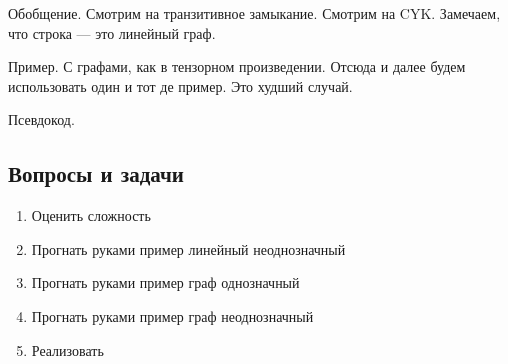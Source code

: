 \begin{definition}

\end{definition}

Обобщение.
Смотрим на транзитивное замыкание.
Смотрим на CYK.
Замечаем, что строка --- это линейный граф.

\begin{example}
Пример. С графами, как в тензорном произведении.
Отсюда и далее будем использовать один и тот де пример. 
Это худший случай.
\end{example}

Псевдокод.

\subsection{Вопросы и задачи}
\begin{enumerate}
  \item Оценить сложность
  \item Прогнать руками пример линейный неоднозначный
  \item Прогнать руками пример граф однозначный
  \item Прогнать руками пример граф неоднозначный
  \item Реализовать
\end{enumerate}
